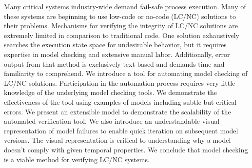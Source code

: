 \begin{comment}
Functional integration of human cognition and machine reasoning is an industry-wide problem where failure risks health or safety.
Differences in human versus machine functioning obscure conventional integration. 
We introduce cognitive work problems (CWP) for rigorous, verifiable functional integration. 
CWP specify the cognitive problem that integrated designs must solve. 
They are technology-neutral, abstract work objects, allowing people and computing to share and transform them in coordination.
The end-to-end method is illustrated on a system that employs AI for remote patient monitoring (RPM) during COVID-19 home care. 
The CWP specified \emph{actionable risk awareness} as the medical problem RPM must solve.
Graphical modeling standards enabled user participation: CWP as finite state machines and system behavior in BPMN. 
For model checking, the CWP’s logical content was translated to linear temporal logic (LTL) and the BPMN into Promela as inputs to the SPIN model checker. 
SPIN verified the Promela implements the LTL correctly.
We conclude this CWP-derived RPM design solves the medical problem and enhances patient safety. 
The method appears general to many critical systems.

\end{comment}

Many critical systems industry-wide demand fail-safe process execution. Many of these systems are beginning to use low-code or no-code (LC/NC) solutions to their problems. Mechanisms for verifying the integrity of LC/NC solutions are extremely limited in comparison to traditional code. One solution exhaustively searches the execution state space for undesirable behavior, but it requires expertise in model checking and extensive manual labor. Additionally, error output from that method is exclusively text-based and demands time and familiarity to comprehend. We introduce a tool for automating model checking of LC/NC solutions. Participation in the automation process requires very little knowledge of the underlying model checking tools. We demonstrate the effectiveness of the tool using examples of models including subtle-but-critical errors. We present an extensible model to demonstrate the scalability of the automated verification tool. We also introduce an understandable visual representation of model failures to enable quick iteration on subsequent model versions. The visual representation is critical to understanding why a model doesn't comply with given temporal properties. We conclude that model checking is a viable method for verifying LC/NC systems.
